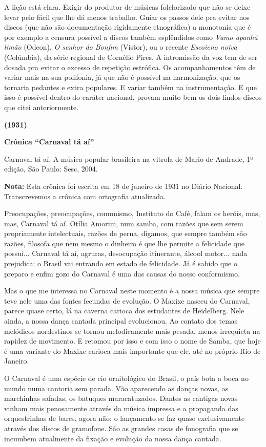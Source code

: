 A lição está clara. Exigir do produtor de músicas folclorizado que não
se deixe levar pelo fácil que lhe dá menos trabalho. Guiar os passos
dele pra evitar nos discos (que não são documentação rigidamente
etnográfica) a monotonia que é por exemplo a censura possível a discos
também esplêndidos como \emph{Vamo apanhá limão} (Odeon), \emph{O senhor
do Bonfim} (Vistor), ou o recente \emph{Escoieno noiva} (Colúmbia), da
série regional de Cornélio Pires. A intromissão da voz tem de ser dosada
pra evitar o excesso de repetição estrófica. Os acompanhamentos têm de
variar mais na sua polifonia, já que não é possível na harmonização, que
os tornaria pedantes e extra populares. E variar também na
instrumentação. E que isso é possível dentro do caráter nacional, provam
muito bem os dois lindos discos que citei anteriormente.

\textbf{(1931)}

\textbf{Crônica ``Carnaval tá aí''}

Carnaval tá aí. A música popular brasileira na vitrola de Mario de
Andrade, 1º edição, São Paulo: Sesc, 2004.

\textbf{Nota:} Esta crônica foi escrita em 18 de janeiro de 1931 no
Diário Nacional. Transcrevemos a crônica com ortografia atualizada.

Preocupações, preocupações, comunismo, Instituto do Café, falam os
heróis, mas, mas, Carnaval tá aí. Otília Amorim, num samba, com razões
que sem serem propriamente intelectuais, razões de perna, digamos, que
sempre também são razões, filosofa que nem mesmo o dinheiro é que lhe
permite a felicidade que possui... Carnaval tá aí, agruras, desocupação
itinerante, álcool motor... nada prejudica: o Brasil vai entrando em
estado de felicidade. Já é sabido que o preparo e enfim gozo do Carnaval
é uma das causas do nosso conformismo.

Mas o que me interessa no Carnaval neste momento é a nossa música que
sempre teve nele uma das fontes fecundas de evolução. O Maxixe nasceu do
Carnaval, parece quase certo, lá na caverna carioca dos estudantes de
Heidelberg. Nele ainda, a nossa dança cantada principal evolucionou. Ao
contato dos temas melódicos nordestinos se tornou melodicamente mais
pesada, menos irrequieta na rapidez de movimento. E retomou por isso e
com isso o nome de Samba, que hoje é uma variante do Maxixe carioca mais
importante que ele, até no próprio Rio de Janeiro.

O Carnaval é uma espécie de cio ornitológico do Brasil, o país bota a
boca no mundo numa cantoria sem parada. Vão aparecendo as danças novas,
as marchinhas safadas, os batuques maracatuzados. Dantes as cantigas
novas vinham mais penosamente através da música impressa e a propaganda
das orquestrinhas de bares, agora não: o lançamento se faz quase
exclusivamente através dos discos de gramofone. São as grandes casas de
fonografia que se incumbem atualmente da fixação e evolução da nossa
dança cantada.

